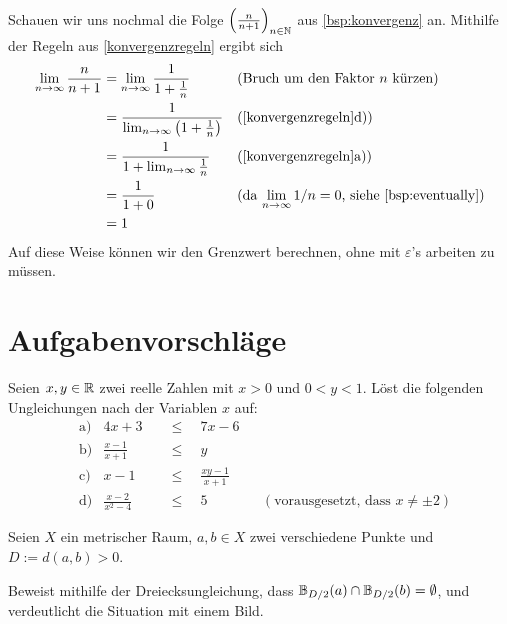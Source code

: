 \begin{bsp}
    Schauen wir uns nochmal die Folge $\left(\frac{n}{n+1}\right)_{n\in \mathbb N}$ aus \cref{bsp:konvergenz} an. Mithilfe der Regeln aus \cref{konvergenzregeln} ergibt sich
    \begin{align*}
        \lim_{n\to\infty} \frac{n}{n+1} & = \lim_{n\to\infty} \frac{1}{1+\frac{1}{n}} && (\text{Bruch um den Faktor $n$ kürzen}) \\
        & = \frac{1}{\lim_{n\to\infty} \left(1+\frac{1}{n}\right)} && (\text{\cref{konvergenzregeln}d)}) \\
        & = \frac{1}{1+\lim_{n\to\infty} \frac{1}{n}} && (\text{\cref{konvergenzregeln}a)}) \\
        & = \frac{1}{1+0} && (\text{da $\lim_{n\to\infty} 1/n=0$, siehe \cref{bsp:eventually}}) \\
        & = 1
    \end{align*}
    Auf diese Weise können wir den Grenzwert berechnen, ohne mit $\varepsilon$'s arbeiten zu müssen.
\end{bsp}





\clearpage
\section{Aufgabenvorschläge}


\begin{aufg}
    Seien $x,y\in \mathbb R$ zwei reelle Zahlen mit $x>0$ und $0<y<1$. Löst die folgenden Ungleichungen nach der Variablen $x$ auf:
    \begin{align*}
        &\text{a)} & 4x + 3 \quad&\le\quad 7x-6 \\[0.5em]
        &\text{b)} & \frac{x-1}{x+1} \quad&\le\quad y \\[0.5em]
        &\text{c)} & x-1 \quad&\le\quad \frac{xy-1}{x+1} \\[0.5em]
        &\text{d)} & \frac{x-2}{x^2-4} \quad&\le\quad 5 && (\text{vorausgesetzt, dass $x\neq \pm 2$})
    \end{align*}
\end{aufg}


\begin{aufg}
    Seien $X$ ein metrischer Raum, $a,b\in X$ zwei verschiedene Punkte und $D:=d(a,b)>0$.
    
    Beweist mithilfe der Dreiecksungleichung, dass $\mathbb B_{D/2}(a)\cap \mathbb B_{D/2}(b)=\emptyset$, und verdeutlicht die Situation mit einem Bild.
\end{aufg}


